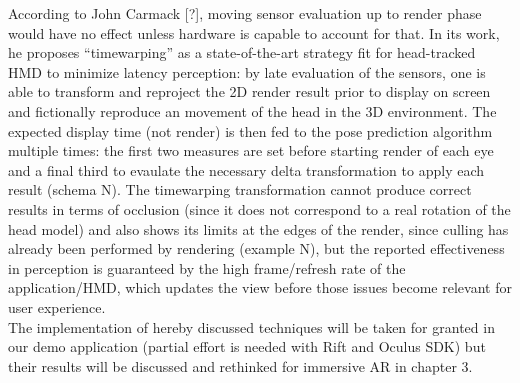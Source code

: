 According to John Carmack [?], moving sensor evaluation up to render phase would have no effect unless hardware is capable to account for that. In its work, he proposes “timewarping” as a state-of-the-art strategy fit for head-tracked HMD to minimize latency perception: by late evaluation of the sensors, one is able to transform and reproject the 2D render result prior to display on screen and fictionally reproduce an movement of the head in the 3D environment. The expected display time (not render) is then fed to the pose prediction algorithm multiple times: the first two measures are set before starting render of each eye and a final third to evaulate the necessary delta transformation to apply each result (schema N). The timewarping transformation cannot produce correct results in terms of occlusion (since it does not correspond to a real rotation of the head model) and also shows its limits at the edges of the render, since culling has already been performed by rendering (example N), but the reported effectiveness in perception is guaranteed by the high frame/refresh rate of the application/HMD, which updates the view before those issues become relevant for user experience.\\
The implementation of hereby discussed techniques will be taken for granted in our demo application (partial effort is needed with Rift and Oculus SDK) but their results will be discussed and rethinked for immersive AR in chapter 3.










